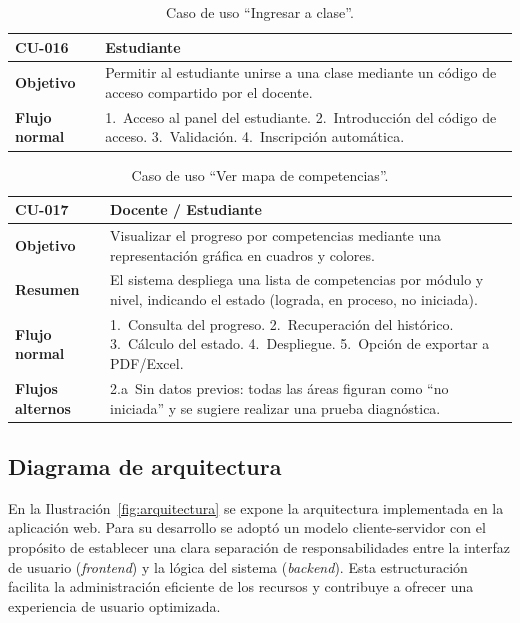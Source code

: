 \begin{table}[H]
\centering
\caption{Caso de uso ``Ingresar a clase''.}
\label{tab:cu_ingresar}
\begin{small}
\begin{tabularx}{\textwidth}{|L{3cm}|X|}
\hline
{}
 CU-016 &  Estudiante\\
\hline
\textbf{Objetivo} & Permitir al estudiante unirse a una clase mediante un código de acceso compartido por el docente.\\
\hline
\textbf{Flujo normal} & 1.~Acceso al panel del estudiante. 2.~Introducción del código de acceso. 3.~Validación. 4.~Inscripción automática.\\
\hline
\end{tabularx}
\end{small}
\fuenteautor
\end{table}

\begin{table}[H]
\centering
\caption{Caso de uso ``Ver mapa de competencias''.}
\label{tab:cu_mapa}
\begin{small}
\begin{tabularx}{\textwidth}{|L{3cm}|X|}
\hline
{}
 CU-017 &  Docente / Estudiante\\
\hline
\textbf{Objetivo} & Visualizar el progreso por competencias mediante una representación gráfica en cuadros y colores.\\
\hline
\textbf{Resumen} & El sistema despliega una lista de competencias por módulo y nivel, indicando el estado (lograda, en proceso, no iniciada).\\
\hline
\textbf{Flujo normal} & 1.~Consulta del progreso. 2.~Recuperación del histórico. 3.~Cálculo del estado. 4.~Despliegue. 5.~Opción de exportar a PDF/Excel.\\
\hline
\textbf{Flujos alternos} & 2.a~Sin datos previos: todas las áreas figuran como ``no iniciada'' y se sugiere realizar una prueba diagnóstica.\\
\hline
\end{tabularx}
\end{small}
\fuenteautor
\end{table}

\subsection{Diagrama de arquitectura}

En la Ilustración~\ref{fig:arquitectura} se expone la arquitectura implementada en la aplicación web. Para su desarrollo se adoptó un modelo cliente-servidor con el propósito de establecer una clara separación de responsabilidades entre la interfaz de usuario (\textit{frontend}) y la lógica del sistema (\textit{backend}). Esta estructuración facilita la administración eficiente de los recursos y contribuye a ofrecer una experiencia de usuario optimizada.

